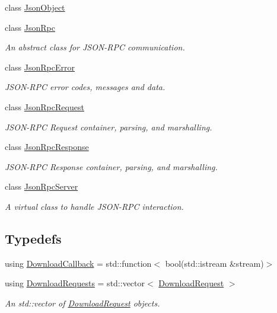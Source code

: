 \begin{DoxyCompactItemize}
class \hyperlink{classdg_1_1deepcore_1_1network_1_1_json_object}{Json\+Object}
\item 
class \hyperlink{classdg_1_1deepcore_1_1network_1_1_json_rpc}{Json\+Rpc}
\begin{DoxyCompactList}\small\item\em An abstract class for J\+S\+O\+N-\/\+R\+PC communication. \end{DoxyCompactList}\item 
class \hyperlink{classdg_1_1deepcore_1_1network_1_1_json_rpc_error}{Json\+Rpc\+Error}
\begin{DoxyCompactList}\small\item\em J\+S\+O\+N-\/\+R\+PC error codes, messages and data. \end{DoxyCompactList}\item 
class \hyperlink{classdg_1_1deepcore_1_1network_1_1_json_rpc_request}{Json\+Rpc\+Request}
\begin{DoxyCompactList}\small\item\em J\+S\+O\+N-\/\+R\+PC Request container, parsing, and marshalling. \end{DoxyCompactList}\item 
class \hyperlink{classdg_1_1deepcore_1_1network_1_1_json_rpc_response}{Json\+Rpc\+Response}
\begin{DoxyCompactList}\small\item\em J\+S\+O\+N-\/\+R\+PC Response container, parsing, and marshalling. \end{DoxyCompactList}\item 
class \hyperlink{classdg_1_1deepcore_1_1network_1_1_json_rpc_server}{Json\+Rpc\+Server}
\begin{DoxyCompactList}\small\item\em A virtual class to handle J\+S\+O\+N-\/\+R\+PC interaction. \end{DoxyCompactList}\end{DoxyCompactItemize}
\subsection*{Typedefs}
\begin{DoxyCompactItemize}
\item 
using \hyperlink{group___network_module_ga4d618c88e9b1e6e961f70621dc9aab41}{Download\+Callback} = std\+::function$<$ bool(std\+::istream \&stream)$>$
\item 
using \hyperlink{group___network_module_ga6a460317d5e2b04bbaa2bb5389ca2ce3}{Download\+Requests} = std\+::vector$<$ \hyperlink{structdg_1_1deepcore_1_1network_1_1_download_request}{Download\+Request} $>$
\begin{DoxyCompactList}\small\item\em An std\+::vector of \hyperlink{structdg_1_1deepcore_1_1network_1_1_download_request}{Download\+Request} objects. \end{DoxyCompactList}\end{DoxyCompactItemize}
